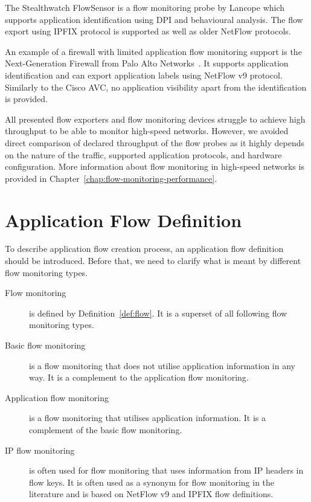 The Stealthwatch FlowSensor\cite{Lancope--Stealthwatch} is a flow monitoring probe by Lancope which supports application identification using DPI and behavioural analysis. The flow export using IPFIX protocol is supported as well as older NetFlow protocols.

An example of a firewall with limited application flow monitoring support is the Next-Generation Firewall from Palo Alto Networks~\cite{PAN--Next}. It supports application identification and can export application labels using NetFlow v9 protocol. Similarly to the Cisco AVC, no application visibility apart from the identification is provided.

All presented flow exporters and flow monitoring devices struggle to achieve high throughput to be able to monitor high-speed networks. However, we avoided direct comparison of declared throughput of the flow probes as it highly depends on the nature of the traffic, supported application protocols, and hardware configuration. More information about flow monitoring in high-speed networks is provided in Chapter~\ref{chap:flow-monitoring-performance}.

\section{Application Flow Definition}\label{sec:app-flow-definition}

To describe application flow creation process, an application flow definition should be introduced. Before that, we need to clarify what is meant by different flow monitoring types.

\begin{description}
  \item[Flow monitoring] is defined by Definition~\ref{def:flow}. It is a superset of all following flow monitoring types.
  \item[Basic flow monitoring] is a flow monitoring that does not utilise application information in any way. It is a complement to the application flow monitoring.
  \item[Application flow monitoring] is a flow monitoring that utilises application information. It is a complement of the basic flow monitoring. 
  \item[IP flow monitoring] is often used for flow monitoring that uses information from IP headers in flow keys. It is often used as a synonym for flow monitoring in the literature and is based on NetFlow v9 and IPFIX flow definitions.
\end{description}

